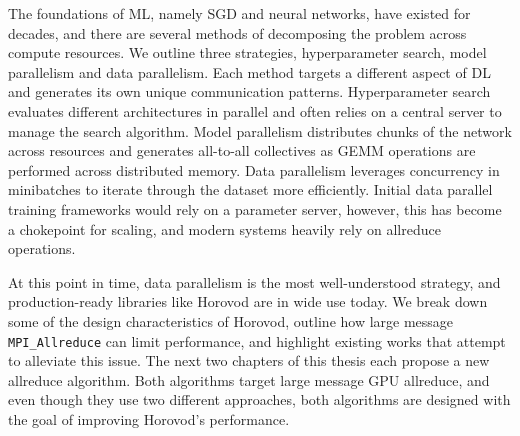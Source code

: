 The foundations of \gls{ML}, namely \gls{SGD} and neural networks, have existed for decades, and there are several methods of decomposing the problem across compute resources.
We outline three strategies, hyperparameter search, model parallelism and data parallelism.
Each method targets a different aspect of \gls{DL} and generates its own unique communication patterns.
Hyperparameter search evaluates different architectures in parallel and often relies on a central server to manage the search algorithm. 
Model parallelism distributes chunks of the network across resources and generates all-to-all collectives as \gls{GEMM} operations are performed across distributed memory.  
Data parallelism leverages concurrency in minibatches to iterate through the dataset more efficiently.
Initial data parallel training frameworks would rely on a parameter server, however, this has become a chokepoint for scaling, and modern systems heavily rely on allreduce operations. 

At this point in time, data parallelism is the most well-understood strategy, and production-ready libraries like Horovod are in wide use today.  
We break down some of the design characteristics of Horovod, outline how large message \texttt{MPI\_Allreduce} can limit performance, and highlight existing works that attempt to alleviate this issue.
The next two chapters of this thesis each propose a new allreduce algorithm.
Both algorithms target large message \gls{GPU} allreduce, and even though they use two different approaches, both algorithms are designed with the goal of improving Horovod's performance.

\clearpage